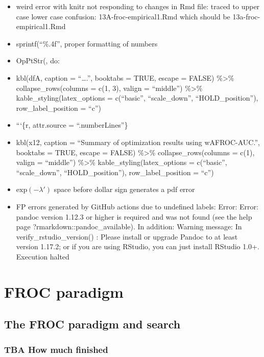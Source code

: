 \documentclass[
]{book}
\providecommand{\tightlist}{%
  \setlength{\itemsep}{0pt}\setlength{\parskip}{0pt}}
\begin{document}
\begin{itemize}
\tightlist
\item
  weird error with knitr not responding to changes in Rmd file: traced to upper case lower case confusion: 13A-froc-empirical1.Rmd which should be 13a-froc-empirical1.Rmd
\item
  sprintf(``\%.4f'', proper formatting of numbers
\item
  OpPtStr(, do:
\item
  kbl(dfA, caption = ``\ldots.'', booktabs = TRUE, escape = FALSE) \%\textgreater\% collapse\_rows(columns = c(1, 3), valign = ``middle'') \%\textgreater\% kable\_styling(latex\_options = c(``basic'', ``scale\_down'', ``HOLD\_position''), row\_label\_position = ``c'')
\item
  ```\{r, attr.source = ``.numberLines''\}
\item
  kbl(x12, caption = ``Summary of optimization results using wAFROC-AUC.'', booktabs = TRUE, escape = FALSE) \%\textgreater\% collapse\_rows(columns = c(1), valign = ``middle'') \%\textgreater\% kable\_styling(latex\_options = c(``basic'', ``scale\_down'', ``HOLD\_position''), row\_label\_position = ``c'')
\item
  \(\text{exp} \left ( -\lambda' \right )\) space before dollar sign generates a pdf error
\item
  FP errors generated by GitHub actions due to undefined labels:
  Error: Error: pandoc version 1.12.3 or higher is required and was not found (see the help page ?rmarkdown::pandoc\_available).
  In addition: Warning message:
  In verify\_rstudio\_version() :
  Please install or upgrade Pandoc to at least version 1.17.2; or if you are using RStudio, you can just install RStudio 1.0+.
  Execution halted
\end{itemize}

\hypertarget{part-froc-paradigm}{%
\part*{FROC paradigm}\label{part-froc-paradigm}}

\hypertarget{froc-paradigm}{%
\chapter{The FROC paradigm and search}\label{froc-paradigm}}

\hypertarget{froc-paradigm-how-much-finished}{%
\section{TBA How much finished}\label{froc-paradigm-how-much-finished}}
\end{document}
